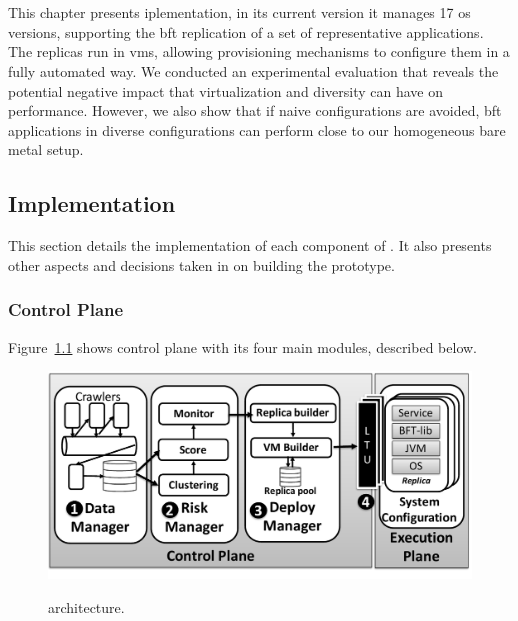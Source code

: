 \chapter{\system}
\label{chap:lazarus_implementation}

This chapter presents \system iplementation, in its current version it manages 17 \gls{os} versions, supporting the \gls{bft} replication of a set of representative applications.
The replicas run in \glspl{vm}, allowing provisioning mechanisms to configure them in a fully automated way.
We conducted an experimental evaluation that reveals the potential negative impact that virtualization and diversity can have on performance. 
However, we also show that if naive configurations are avoided, \gls{bft} applications in diverse configurations can perform close to our homogeneous bare metal setup.


\section{Implementation}
\label{sec:implementation}

This section details the implementation of each component of \system. 
It also presents other aspects and decisions taken in on building the prototype.%


\subsection{Control Plane}
\label{sec:lazarus}

Figure~\ref{fig:arch1} shows \system control plane with its four main modules, described below.

\begin{figure}[h]
\begin{center}
\includegraphics[width=.9\columnwidth]{images/images/architecture_new.pdf}
\vspace{-5mm}
\caption{\system architecture.}
\vspace{-5mm}
\label{fig:arch1}
\end{center}
\end{figure}


